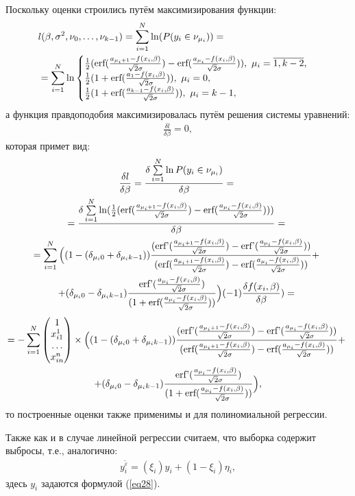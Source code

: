 Поскольку оценки строились путём максимизирования функции:
\begin{eqnarray}
    &l(\beta,\sigma^2, \nu_0,\dots, \nu_{k-1})=\sum_{i=1}^{N}\ln(P(y_i\in \nu_{\mu_i}))=\\
    &=\sum\limits_{i=1}^{N}\ln\begin{cases}
        \frac{1}{2}(\textup{erf}(\frac{a_{\mu_i+1}-f(x_i,\beta)}{\sqrt{2}\sigma})-\textup{erf}(\frac{a_{\mu_i}-f(x_i,\beta)}{\sqrt{2}\sigma})),~\mu_i=\overline{1,k-2},\\
        \frac{1}{2}(1+\textup{erf}(\frac{a_{1}-f(x_i,\beta)}{\sqrt{2}\sigma})),~\mu_i=0,\\
        \frac{1}{2}(1+\textup{erf}(\frac{a_{k-1}-f(x_i,\beta)}{\sqrt{2}\sigma})),~\mu_i=k-1,
    \end{cases}
\end{eqnarray}
а функция правдоподобия максимизировалась путём решения системы уравнений:
\begin{eqnarray}
    \frac{\delta l}{\delta \beta}=0,
\end{eqnarray}
которая примет вид:
\begin{multline}
    \frac{\delta l}{\delta \beta}=\frac{\delta \sum\limits_{i=1}^{N}\ln P(y_i\in \nu_{\mu_i})}{\delta \beta}=~\\
    =\frac{\delta \sum\limits_{i=1}^{N} \ln(\frac{1}{2}(\textup{erf}(\frac{a_{\mu_i+1}-f(x_i,\beta)}{\sqrt{2}\sigma})-\textup{erf}(\frac{a_{\mu_i}-f(x_i,\beta)}{\sqrt{2}\sigma})) )         }{\delta \beta}=~\\
    =  \sum\limits_{i=1}^{N}\Big((1-(\delta_{\mu_i 0}+\delta_{\mu_i k-1}))\frac{(\textup{erf'}(\frac{a_{\mu_i+1}-f(x_i,\beta)}{\sqrt{2}\sigma})-\textup{erf'}(\frac{a_{\mu_i}-f(x_i,\beta)}{\sqrt{2}\sigma}))}{ (\textup{erf}(\frac{a_{\mu_i+1}-f(x_i,\beta)}{\sqrt{2}\sigma})-\textup{erf}(\frac{a_{\mu_i}-f(x_i,\beta)}{\sqrt{2}\sigma}))}+~\\
    +(\delta_{\mu_i 0}-\delta_{\mu_i k-1})\frac{\textup{erf'}(\frac{a_{\mu_i}-f(x_i,\beta)}{\sqrt{2}\sigma})}{(1+\textup{erf}(\frac{a_{\mu_i}-f(x_i,\beta)}{\sqrt{2}\sigma}))}\Big)  (-1) \frac{\delta f(x_i,\beta)}{\delta \beta} )=~
\end{multline}
\begin{multline}
    \nonumber 
    =-\sum_{i=1}^{N}\begin{pmatrix}
        1\\
        x_{i1}^1\\
        \dots\\
        x_{in}^n
    \end{pmatrix}\times  \Big((1-(\delta_{\mu_i 0}+\delta_{\mu_i k-1}))\frac{(\textup{erf'}(\frac{a_{\mu_i+1}-f(x_i,\beta)}{\sqrt{2}\sigma})-\textup{erf'}(\frac{a_{\mu_i}-f(x_i,\beta)}{\sqrt{2}\sigma}))}{ (\textup{erf}(\frac{a_{\mu_i+1}-f(x_i,\beta)}{\sqrt{2}\sigma})-\textup{erf}(\frac{a_{\mu_i}-f(x_i,\beta)}{\sqrt{2}\sigma}))}+~\\
    +(\delta_{\mu_i 0}-\delta_{\mu_i k-1})\frac{\textup{erf'}(\frac{a_{\mu_i}-f(x_i,\beta)}{\sqrt{2}\sigma})}{(1+\textup{erf}(\frac{a_{\mu_i}-f(x_i,\beta)}{\sqrt{2}\sigma}))}\Big),
\end{multline}
то построенные оценки также применимы и для полиномиальной регрессии.

Также как и в случае линейной регрессии считаем, что выборка содержит выбросы, т.е., аналогично:
\begin{eqnarray}
    y_i^{\widetilde{\varepsilon}}=(\xi_i)y_i+ (1-\xi_i)\eta_i,
\end{eqnarray}
здесь $y_i$ задаются формулой (\ref{eq28}).

